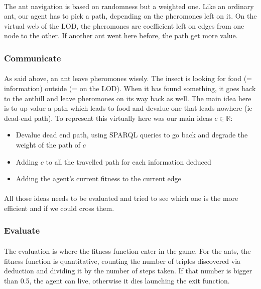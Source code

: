 \documentclass{article}
\newenvironment{itemh}[0]{\begin{itemize}[label=$\heartsuit$, font=\color{mygray} \small]}{\end{itemize}}
\begin{document}
		\paragraph{}
		The ant navigation is based on randomness but a weighted one.
		Like an ordinary ant, our agent has to pick a path, depending on the pheromones left on it.
		On the virtual web of the LOD, the pheromones are coefficient left on edges from one node to the other.
		If another ant went here before, the path get more value.
		\subsubsection{Communicate}
		\paragraph{}
		As said above, an ant leave pheromones wisely.
		The insect is looking for food (= information) outside (= on the LOD).
		When it has found something, it goes back to the anthill and leave pheromones on its way back as well.
		The main idea here is to up value a path which leads to food and devalue one that leads nowhere (ie dead-end path).
		To represent this virtually here was our main ideas $c \in \mathbb{R}$:
		\begin{itemh}
		\item Devalue dead end path, using SPARQL queries to go back and degrade the weight of the path of $c$
		\item Adding $c$ to all the travelled path for each information deduced
		\item Adding the agent's current fitness to the current edge
		\end{itemh}
		\paragraph{}
		All those ideas needs to be evaluated and tried to see which one is the more efficient and if we could cross them.
		\subsubsection{Evaluate}
		\paragraph{}
		The evaluation is where the fitness function enter in the game.
		For the ants, the fitness function is quantitative,
		counting the number of triples discovered via deduction and dividing it by the number of steps taken.
		If that number is bigger than 0.5, the agent can live, otherwise it dies launching the exit function.
\end{document}
